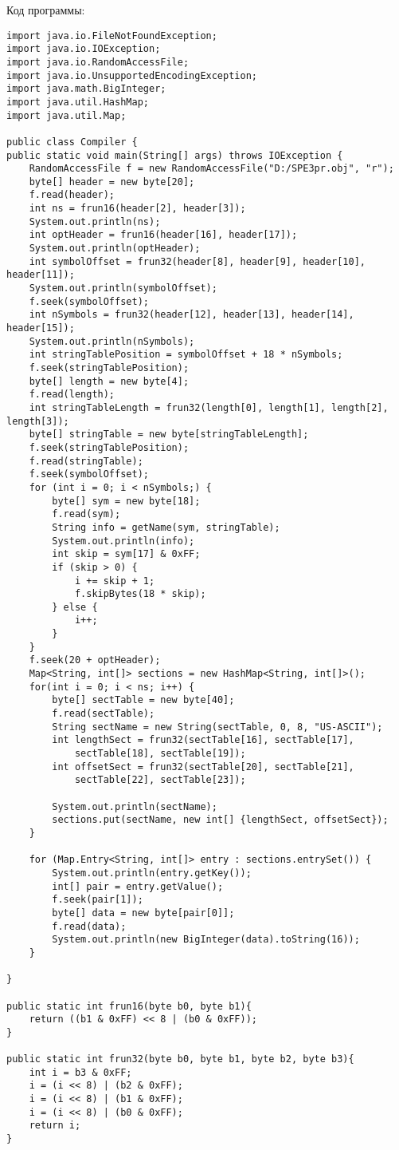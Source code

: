 Код программы:
\small
\begin{Verbatim}
import java.io.FileNotFoundException;
import java.io.IOException;
import java.io.RandomAccessFile;
import java.io.UnsupportedEncodingException;
import java.math.BigInteger;
import java.util.HashMap;
import java.util.Map;

public class Compiler {
public static void main(String[] args) throws IOException {
	RandomAccessFile f = new RandomAccessFile("D:/SPE3pr.obj", "r");
	byte[] header = new byte[20];
	f.read(header);
	int ns = frun16(header[2], header[3]);
	System.out.println(ns);
	int optHeader = frun16(header[16], header[17]);
	System.out.println(optHeader);
	int symbolOffset = frun32(header[8], header[9], header[10], header[11]);
	System.out.println(symbolOffset);
	f.seek(symbolOffset);
	int nSymbols = frun32(header[12], header[13], header[14], header[15]);
	System.out.println(nSymbols);
	int stringTablePosition = symbolOffset + 18 * nSymbols;
	f.seek(stringTablePosition);
	byte[] length = new byte[4];
	f.read(length);
	int stringTableLength = frun32(length[0], length[1], length[2], length[3]);
	byte[] stringTable = new byte[stringTableLength];
	f.seek(stringTablePosition);
	f.read(stringTable);
	f.seek(symbolOffset);
	for (int i = 0; i < nSymbols;) {
		byte[] sym = new byte[18];
		f.read(sym);
		String info = getName(sym, stringTable);
		System.out.println(info);
		int skip = sym[17] & 0xFF;
		if (skip > 0) {
			i += skip + 1;
			f.skipBytes(18 * skip);
		} else {
			i++;
		}
	}
	f.seek(20 + optHeader);
	Map<String, int[]> sections = new HashMap<String, int[]>();
	for(int i = 0; i < ns; i++) {
		byte[] sectTable = new byte[40];
		f.read(sectTable);
		String sectName = new String(sectTable, 0, 8, "US-ASCII");
		int lengthSect = frun32(sectTable[16], sectTable[17], 
			sectTable[18], sectTable[19]);
		int offsetSect = frun32(sectTable[20], sectTable[21], 
			sectTable[22], sectTable[23]);
		
		System.out.println(sectName);
		sections.put(sectName, new int[] {lengthSect, offsetSect});
	}

	for (Map.Entry<String, int[]> entry : sections.entrySet()) {
		System.out.println(entry.getKey());
		int[] pair = entry.getValue();
		f.seek(pair[1]);
		byte[] data = new byte[pair[0]];
		f.read(data);
		System.out.println(new BigInteger(data).toString(16));
	}

}

public static int frun16(byte b0, byte b1){
	return ((b1 & 0xFF) << 8 | (b0 & 0xFF));
}

public static int frun32(byte b0, byte b1, byte b2, byte b3){
	int i = b3 & 0xFF;
	i = (i << 8) | (b2 & 0xFF);
	i = (i << 8) | (b1 & 0xFF);
	i = (i << 8) | (b0 & 0xFF);
	return i;
}


\end{Verbatim}
